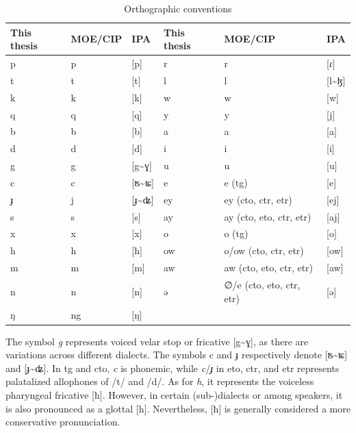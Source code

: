 \begin{table}[!htbp]
\centering
\caption{Orthographic conventions}
\label{tab:orth}
\begin{tabular}{lll|lll}
\hline
This thesis & MOE/CIP & IPA    & This thesis & MOE/CIP                   & IPA   \\ \hline
p          & p       & [p]    & r          & r                         & [ɾ]   \\
t          & t       & [t]    & l          & l                         & [l\~{ }ɮ] \\
k          & k       & [k]    & w          & w                         & [w]   \\
q          & q       & [q]    & y          & y                         & [j]   \\
b          & b       & [b]    & a          & a                         & [a]   \\
d          & d       & [d]    & i          & i                         & [i]   \\
g          & g       & [g\~{ }ɣ]  & u      & u                         & [u]   \\
c          & c       & [ʦ\~{ }ʨ]   & e     & e (\ac{tg})                  & [e]   \\
ɟ          & j       & [ɟ\~{ }ʥ] & ey      & ey (\ac{cto}, \ac{ctr}, \ac{etr})   & [ej]  \\
s          & s       & [s]    & ay         & ay (\ac{cto}, \ac{eto}, \ac{ctr}, \ac{etr})  & [aj]      \\
x          & x       & [x]    & o          & o (\ac{tg})                  & [o]   \\
h          & h       & [ħ]    & ow         & o/ow (\ac{cto}, \ac{ctr}, \ac{etr}) & [ow]  \\
m          & m       & [m]    & aw         & aw (\ac{cto}, \ac{eto}, \ac{ctr}, \ac{etr})                         & [aw]      \\
n          & n       & [n]    & ə          & ∅/e (\ac{cto}, \ac{eto}, \ac{ctr}, \ac{etr})    & [ə]   \\
ŋ          & ng      & [ŋ]    &            &                           &       \\ \hline
\end{tabular}
\end{table}

The symbol \textit{g} represents voiced velar stop or fricative [g\~{ }ɣ], as there are variations across different dialects. The symbols c and ɟ respectively denote [ʦ\~{ }ʨ] and [ɟ\~{ }ʥ]. In \acl{tg} and \acl{cto}, \textit{c} is phonemic, while \textit{c}/\textit{ɟ} in \acl{eto}, \acl{ctr}, and \acl{etr} represents palatalized allophones of /t/ and /d/. As for \textit{h}, it represents the voiceless pharyngeal fricative [ħ]. However, in certain (sub-)dialects or among speakers, it is also pronounced as a glottal [h]. Nevertheless, [ħ] is generally considered a more conservative pronunciation.

